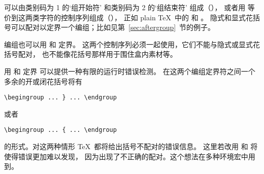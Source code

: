 \documentclass[letterpaper]{book}
\begin{document}
可以由类别码为 1 的`组开始符'%
和类别码为 2 的`组结束符' 组成（），
或者用  等价到这两类字符的控制序列组成（），
正如 plain \TeX\ 中的  和 。
隐式和显式花括号可以配对以定界一个编组；比如见第~\ref{sec:aftergroup}~节的例子。

编组也可以用  和  定界。
这两个控制序列必须一起使用，它们不能与隐式或显式花括号配对，
也不能像花括号那样用于围住盒内素材等。

用  和  定界%
\label{begin:end:macros}%
可以提供一种有限的运行时错误检测。
在这两个编组定界符之间一个多余的开或闭花括号将有
\begin{verbatim}
\begingroup ... } ... \endgroup
\end{verbatim}
或者
\begin{verbatim}
\begingroup ... { ... \endgroup
\end{verbatim}
的形式。对这两种情形 \TeX\ 都将给出括号不配对的错误信息。
这里若改用  和  将使得错误更加难以发现，
因为出现了不正确的配对。这个想法在多种环境宏中用到。
\end{document}
